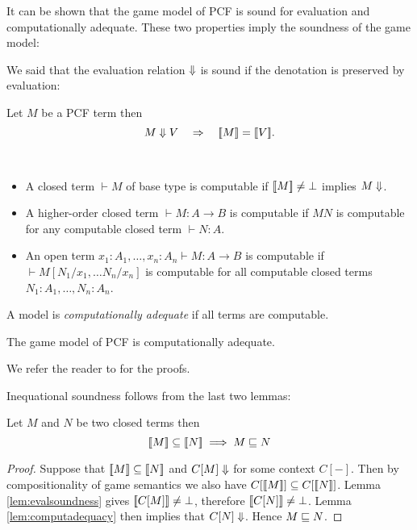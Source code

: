 It can be shown that the game model of PCF is sound for evaluation
and computationally adequate. These two properties imply the
soundness of the game model:

We said that the evaluation relation $\Downarrow$ is sound if the
denotation is preserved by evaluation:
\begin{lem}
\label{lem:evalsoundness}
 Let $M$ be a PCF term then
$$M \Downarrow V \quad \Rightarrow \quad {[\![M ]\!]} = {[\![ V ]\!]}.$$
\end{lem}

\begin{dfn} \
\begin{itemize}
\item A closed term $\vdash M$ of base type is computable if ${[\![ M ]\!]} \neq \bot$
implies $M \Downarrow$.
\item A higher-order closed term $\vdash M : A\rightarrow B$ is computable if $M N$ is computable for any computable closed term $\vdash  N:A$.
\item An open term $x_1 : A_1, \ldots, x_n : A_n \vdash M : A\rightarrow B$ is computable if $\vdash M [N_1/x_1, \ldots N_n/x_n]$ is computable
for all computable closed terms $N_1:A_1, \ldots, N_n:A_n$.
\end{itemize}
\end{dfn}

A model is \emph{computationally adequate} if all
terms are computable.
\begin{lem}
\label{lem:computadequacy}
The game model of PCF is
computationally adequate.
\end{lem}
We refer the reader to \cite{abramsky:game-semantics-tutorial} for
the proofs.

Inequational soundness follows from the last two lemmas:
\begin{prop}
\label{prop:ineqsoundness} Let $M$ and $N$ be two closed terms then
$${[\![ M ]\!]} \subseteq {[\![N ]\!]} \implies  M \sqsubseteq N $$
\end{prop}
\begin{proof}
  Suppose that ${[\![ M ]\!]} \subseteq {[\![N ]\!]}$ and $C[M] \Downarrow$ for some context $C[-]$. Then by compositionality of game semantics we also have
  $C[{[\![ M ]\!]}] \subseteq C[{[\![ N ]\!]}]$.
  Lemma \ref{lem:evalsoundness} gives ${[\![ C[M] ]\!]} \neq \bot$, therefore ${[\![ C[N] ]\!]} \neq \bot$.
  Lemma \ref{lem:computadequacy} then implies that $C[N] \Downarrow$.
  Hence $M \sqsubseteq N$.
\end{proof}

